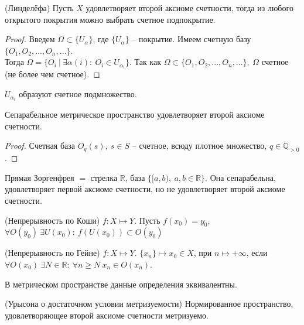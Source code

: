 \begin{theorem}
    (Линделёфа) Пусть $X$ удовлетворяет второй аксиоме счетности, тогда из любого открытого покрытия можно выбрать счетное подпокрытие.
\end{theorem}
\begin{proof}
    Введем $\Omega \subset \{U_\alpha\}$, где $\{U_\alpha\}$ -- покрытие. Имеем счетную базу $\{O_1, O_2,...,O_n,...\}$.\\ Тогда $\Omega = \{O_i\ |\ \exists \alpha(i):\ O_i \in U_{\alpha_i}\}$. Так как $\Omega \subset \{O_1, O_2,...,O_n,...\},\ \Omega$ счетное (не более чем счетное).
\end{proof}

\begin{statement}
    $U_{\alpha_i}$ образуют счетное подмножество.
\end{statement}

\begin{theorem}
    Сепарабельное метрическое пространство удовлетворяет второй аксиоме счетности.
\end{theorem}
\begin{proof}
    Счетная база $O_q(s),\ s \in S$ -- счетное, всюду плотное множество, $q \in \mathbb{Q}_{>0}$. 
\end{proof}

\begin{example}
    Прямая Зоргенфрея $=$ стрелка $\mathbb{R}$, база $\{[a, b),\ a,b \in \mathbb{R}\}$. Она сепарабельна, удовлетворяет первой аксиоме счетности, но не удовлетворяет второй аксиоме счетности.
\end{example}

\begin{definition}
    (Непрерывность по Коши) $f: X \mapsto Y$. Пусть $f(x_0) = y_0$, $\forall O(y_0)\ \exists U(x_0):\ f(U(x_0)) \subset O(y_0)$
\end{definition}

\begin{definition}
    (Непрерывность по Гейне) $f: X \mapsto Y$. $\{x_n\} \mapsto x_0 \in X$, при $n \mapsto +\infty$, если $\forall O(x_0)\ \exists N \in \mathbb{R}:\ \forall n \geq N\ x_n \in O(x_n)$.
\end{definition}

\begin{theorem}
    В метрическом пространстве данные определения эквивалентны.
\end{theorem}

\begin{theorem}
    (Урысона о достаточном условии метризуемости) Нормированное пространство, удовлетворяющее второй аксиоме счетности метризуемо.
\end{theorem}

